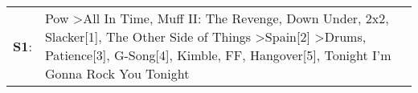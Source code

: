 \begin{supertabular}{p{0.03\textwidth}p{0.92\textwidth}}
 \textbf{S1}:  &  Pow\textsuperscript{} \textgreater \enspace All In Time\textsuperscript{}, \enspace Muff II: The Revenge\textsuperscript{}, \enspace Down Under\textsuperscript{}, \enspace 2x2\textsuperscript{}, \enspace Slacker[1]\textsuperscript{}, \enspace The Other Side of Things\textsuperscript{} \textgreater \enspace Spain[2]\textsuperscript{} \textgreater \enspace Drums\textsuperscript{}, \enspace Patience[3]\textsuperscript{}, \enspace G-Song[4]\textsuperscript{}, \enspace Kimble\textsuperscript{}, \enspace FF\textsuperscript{}, \enspace Hangover[5]\textsuperscript{}, \enspace Tonight I'm Gonna Rock You Tonight\textsuperscript{}  \enspace  \\
\end{supertabular}
